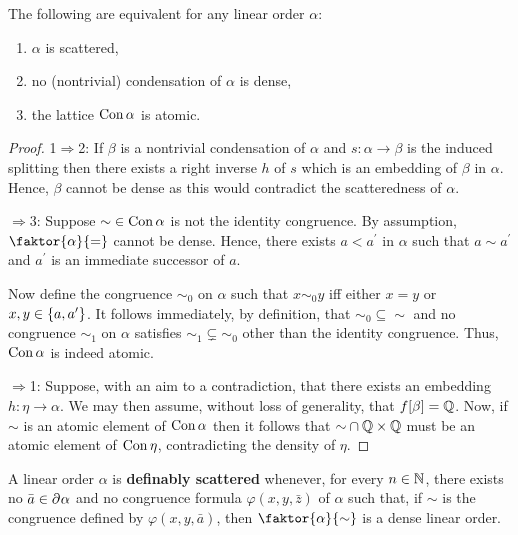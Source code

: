 \begin{prp}
	The following are equivalent for any linear order $\alpha$:
	\begin{enumerate}
		\item  $\alpha$ is scattered,
		\item  no (nontrivial) condensation of $\alpha$ is dense,
		\item  the lattice $\con\alpha$ is atomic.
	\end{enumerate}
\end{prp}
\begin{proof}
	1$\Rightarrow$2:  If $\beta$ is a nontrivial condensation of $\alpha$ and
	$s\colon\alpha\to\beta$ is the induced splitting then there exists a right
	inverse $h$ of $s$ which is an embedding of $\beta$ in $\alpha$.  Hence,
	$\beta$ cannot be dense as this would contradict the scatteredness of
	$\alpha$.

	\smallskip{}$\Rightarrow$3:  Suppose ${\sim}\in\con\alpha$ is not the identity
	congruence.  By assumption, $\faktor{\alpha}{=}$ cannot be dense.  Hence,
	there exists $a<a^\prime$ in $\alpha$ such that $a\sim a^\prime$ and
	$a^\prime$ is an immediate successor of $a$.

	Now define the congruence $\sim_0$ on $\alpha$ such that $x\sim_0 y$ iff
	either $x=y$ or $x,y\in\set{a,a^\prime}$.  It follows immediately, by
	definition, that ${\sim_0}\subseteq{\sim}$ and no congruence $\sim_1$ on
	$\alpha$ satisfies ${\sim_1}\subsetneq{\sim_0}$ other than the identity
	congruence.  Thus, $\con\alpha$ is indeed atomic.

	\smallskip{}$\Rightarrow$1:  Suppose, with an aim to a
	contradiction, that there exists an embedding $h\colon\eta\to\alpha$.  We
	may then assume, without loss of generality, that $f[\beta]=\rats$.  Now, if
	$\sim$ is an atomic element of $\con\alpha$ then it follows that
	${\sim}\cap\rats\times\rats$ must be an atomic element of $\con\eta$,
	contradicting the density of $\eta$.
\end{proof}

    \begin{dfn}
	    A linear order $\alpha$ is \textbf{definably scattered} whenever, for every $n\in\nats$, there exists no $\bar{a}\in\domain{n}\alpha$ and no congruence formula $\varphi(x,y,\bar{z})$ of $\alpha$ such that, if $\sim$ is the congruence defined by $\varphi(x,y,\bar{a})$, then $\faktor{\alpha}{\sim}$ is a dense linear order.
    \end{dfn}

